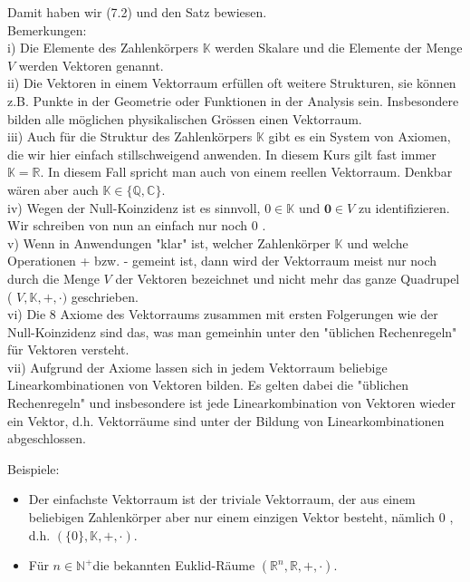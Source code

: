 \documentclass[10pt]{article}
\begin{document}
Damit haben wir (7.2) und den Satz bewiesen.\\
Bemerkungen:\\
i) Die Elemente des Zahlenkörpers $\mathbb{K}$ werden Skalare und die Elemente der Menge $V$ werden Vektoren genannt.\\
ii) Die Vektoren in einem Vektorraum erfüllen oft weitere Strukturen, sie können z.B. Punkte in der Geometrie oder Funktionen in der Analysis sein. Insbesondere bilden alle möglichen physikalischen Grössen einen Vektorraum.\\
iii) Auch für die Struktur des Zahlenkörpers $\mathbb{K}$ gibt es ein System von Axiomen, die wir hier einfach stillschweigend anwenden. In diesem Kurs gilt fast immer $\mathbb{K}=\mathbb{R}$. In diesem Fall spricht man auch von einem reellen Vektorraum. Denkbar wären aber auch $\mathbb{K} \in\{\mathbb{Q}, \mathbb{C}\}$.\\
iv) Wegen der Null-Koinzidenz ist es sinnvoll, $0 \in \mathbb{K}$ und $\mathbf{0} \in V$ zu identifizieren. Wir schreiben von nun an einfach nur noch 0 .\\
v) Wenn in Anwendungen "klar" ist, welcher Zahlenkörper $\mathbb{K}$ und welche Operationen + bzw. - gemeint ist, dann wird der Vektorraum meist nur noch durch die Menge $V$ der Vektoren bezeichnet und nicht mehr das ganze Quadrupel ( $V, \mathbb{K},+, \cdot)$ geschrieben.\\
vi) Die 8 Axiome des Vektorraums zusammen mit ersten Folgerungen wie der Null-Koinzidenz sind das, was man gemeinhin unter den "üblichen Rechenregeln" für Vektoren versteht.\\
vii) Aufgrund der Axiome lassen sich in jedem Vektorraum beliebige Linearkombinationen von Vektoren bilden. Es gelten dabei die "üblichen Rechenregeln" und insbesondere ist jede Linearkombination von Vektoren wieder ein Vektor, d.h. Vektorräume sind unter der Bildung von Linearkombinationen abgeschlossen.

Beispiele:

\begin{itemize}
  \item Der einfachste Vektorraum ist der triviale Vektorraum, der aus einem beliebigen Zahlenkörper aber nur einem einzigen Vektor besteht, nämlich 0 , d.h. $(\{0\}, \mathbb{K},+, \cdot)$.
  \item Für $n \in \mathbb{N}^{+}$die bekannten Euklid-Räume $\left(\mathbb{R}^{n}, \mathbb{R},+, \cdot\right)$.
\end{itemize}
\end{document}
